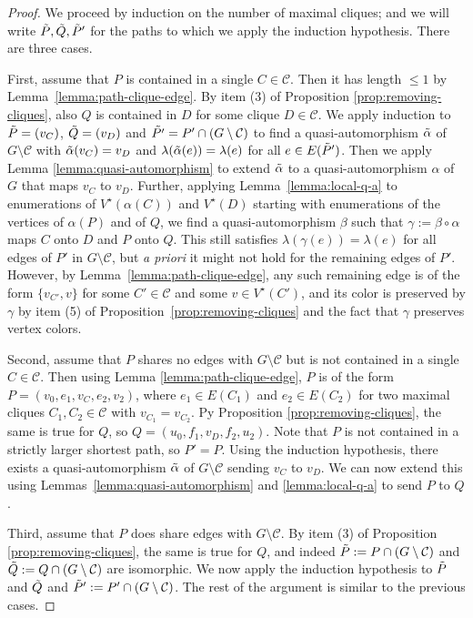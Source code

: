 \documentclass[a4paper, 11pt]{amsart}
\numberwithin{theorem}{section}
\newcommand{\cC}{\mathcal{C}}
\begin{document}
\begin{proof}
    We proceed by induction on the number of maximal cliques; and we
    will write $\Tilde{P},\Tilde{Q},\Tilde{P}'$ for the paths to which
    we apply the induction hypothesis. There are three cases.

First, assume that $P$ is contained in a single $C \in
\mathcal{C}$. Then it has length $\leq 1$ by
Lemma~\ref{lemma:path-clique-edge}. 
By item (3) of Proposition \ref{prop:removing-cliques},
also $Q$ is contained in $D$ for some clique $D \in
\cC$. We apply induction to $\Tilde{P} = (v_C)$, $\Tilde{Q}
= (v_D)$ and $\Tilde{P'} = P'\cap (G\setminus \mathcal{C})$
to find a quasi-automorphism $\Tilde{\alpha}$ of $G \setminus
\mathcal{C}$ with $\Tilde{\alpha}(v_C)=v_D$ and
$\lambda(\Tilde{\alpha}(e))=\lambda(e)$ for all $e \in E(\Tilde{P}')$.
Then we apply Lemma \ref{lemma:quasi-automorphism} to extend
$\Tilde{\alpha}$ to a quasi-automorphism $\alpha$ of $G$ that maps $v_C$
to $v_D$. Further, applying Lemma~\ref{lemma:local-q-a} to enumerations of
$V^\star(\alpha(C))$ and $V^\star(D)$ starting with enumerations of the
vertices of $\alpha(P)$ and of $Q$, we find a quasi-automorphism $\beta$
such that $\gamma:=\beta \circ \alpha$ maps $C$ onto $D$ and $P$ onto
$Q$. This still satisfies $\lambda(\gamma(e))=\lambda(e)$ for all edges of
$P'$ in $G \setminus \cC$, but {\em a priori} it might not hold for the
remaining edges of $P'$. However, by Lemma~\ref{lemma:path-clique-edge},
any such remaining edge is of the form $\{v_{C'},v\}$ for some $C'
\in \cC$ and some $v \in V^\star(C')$, and its color is preserved by
$\gamma$ by item (5) of Proposition~\ref{prop:removing-cliques} and
the fact that $\gamma$ preserves vertex colors.

Second, assume that $P$ shares no edges with $G \setminus
\cC$ but is not contained in a single $C \in \cC$. Then using
Lemma \ref{lemma:path-clique-edge}, $P$ is of the form $P =
(v_0,e_1,v_C,e_2,v_2)$, where $e_1 \in E(C_1)$ and $e_2\in E(C_2)$ for
two maximal cliques $C_1,C_2 \in \mathcal{C}$ with $v_{C_1}=v_{C_2}$. Py
Proposition \ref{prop:removing-cliques}, the same is true for $Q$, so $Q=
(u_0,f_1,v_D,f_2,u_2)$. Note that $P$ is not contained in a strictly larger
shortest path, so $P'=P$. Using the induction hypothesis, there exists a
quasi-automorphism $\Tilde{\alpha}$ of $G \setminus \cC$ sending $v_C$ to
$v_D$. We can now extend this using Lemmas~\ref{lemma:quasi-automorphism}
and \ref{lemma:local-q-a} to send $P$ to $Q$.

Third, assume that $P$ does share edges with $G \setminus \cC$.  By item
(3) of Proposition \ref{prop:removing-cliques}, the same is true for $Q$,
and indeed $\Tilde{P} := P\cap (G\setminus\mathcal{C})$ and $\Tilde{Q}
:= Q\cap (G\setminus\mathcal{C})$ are isomorphic. We now apply the
induction hypothesis to $\Tilde{P}$ and $\Tilde{Q}$ and $\Tilde{P}':=
P' \cap (G \setminus \mathcal{C})$. The rest of the argument is similar
to the previous cases. 
\end{proof}
\end{document}
